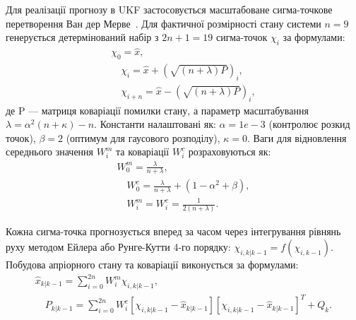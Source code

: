 Для реалізації прогнозу в \gls{UKF} застосовується масштабоване сигма-точкове перетворення Ван дер Мерве~\cite{julier_uhlmann,wan_vandermerwe}. Для фактичної
розмірності стану системи $n=9$ генерується детермінований набір з $2n+1=19$ сигма-точок $\chi_{i}$ за формулами:
\begin{equation}
\begin{gathered}
    \chi_0 = \hat{x}, \\
    \quad \chi_i = \hat{x} + \left(\sqrt{(n + \lambda) P} \right)_i, \\
    \quad \chi_{i+n} = \hat{x} - \left(\sqrt{(n + \lambda) P} \right)_i,
\end{gathered}
\end{equation}
де P — матриця коваріації помилки стану, а параметр масштабування
$\lambda = \alpha^2(n + \kappa) - n.$ Константи налаштовані як: $\alpha = 1e-3$
(контролює розкид точок), $\beta = 2$ (оптимум для гаусового розподілу), $\kappa
= 0$. Ваги для відновлення середнього значення $W_i^m$ та коваріації $W_i^c$
розраховуються як:
\begin{equation}
\begin{gathered}
    W_0^m = \frac{\lambda}{n + \lambda}, \\
    \quad W_0^c = \frac{\lambda}{n + \lambda} + (1 - \alpha^2 + \beta), \\
    \quad W_i^m = W_i^c = \frac{1}{2(n + \lambda)}.
\end{gathered}
\end{equation}

Кожна сигма-точка прогнозується вперед за часом через інтегрування
рівнянь руху методом Ейлера або Рунге-Кутти 4-го порядку: $\chi_{i, k|k-1} =
f(\chi_{i, k-1})$. Побудова апріорного стану та коваріації виконується за
формулами:
\begin{equation}
\begin{gathered}
    \hat{x}_{k|k-1} = \sum_{i=0}^{2n} W_i^m \chi_{i, k|k-1}, \\
    \quad P_{k|k-1} = \sum_{i=0}^{2n} W_i^c \left[\chi_{i, k|k-1} - \hat{x}_{k|k-1} \right]\left[\chi_{i, k|k-1} - \hat{x}_{k|k-1}
    \right]^T + Q_k.
\end{gathered}
\end{equation}

